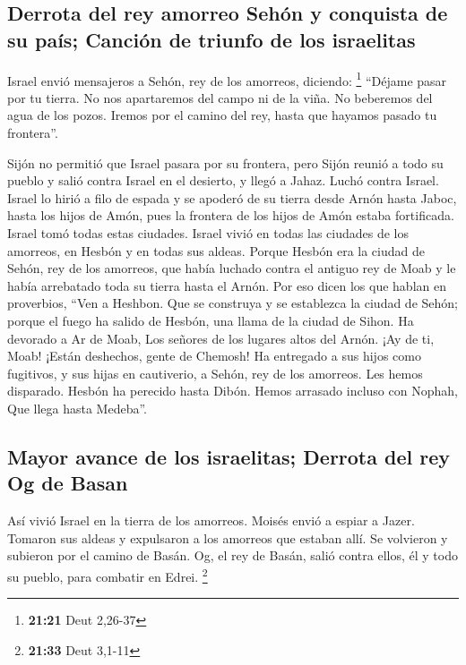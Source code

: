 \hypertarget{derrota-del-rey-amorreo-sehuxf3n-y-conquista-de-su-pauxeds-canciuxf3n-de-triunfo-de-los-israelitas}{%
\subsection{Derrota del rey amorreo Sehón y conquista de su país;
Canción de triunfo de los
israelitas}\label{derrota-del-rey-amorreo-sehuxf3n-y-conquista-de-su-pauxeds-canciuxf3n-de-triunfo-de-los-israelitas}}

 Israel envió mensajeros a Sehón, rey de los amorreos,
diciendo: \footnote{\textbf{21:21} Deut 2,26-37} 
``Déjame pasar por tu tierra. No nos apartaremos del campo ni de la
viña. No beberemos del agua de los pozos. Iremos por el camino del rey,
hasta que hayamos pasado tu frontera''.

 Sijón no permitió que Israel pasara por su frontera,
pero Sijón reunió a todo su pueblo y salió contra Israel en el desierto,
y llegó a Jahaz. Luchó contra Israel.  Israel lo hirió a
filo de espada y se apoderó de su tierra desde Arnón hasta Jaboc, hasta
los hijos de Amón, pues la frontera de los hijos de Amón estaba
fortificada.  Israel tomó todas estas ciudades. Israel
vivió en todas las ciudades de los amorreos, en Hesbón y en todas sus
aldeas.  Porque Hesbón era la ciudad de Sehón, rey de los
amorreos, que había luchado contra el antiguo rey de Moab y le había
arrebatado toda su tierra hasta el Arnón.  Por eso dicen
los que hablan en proverbios, ``Ven a Heshbon. Que se construya y se
establezca la ciudad de Sehón;  porque el fuego ha salido
de Hesbón, una llama de la ciudad de Sihon. Ha devorado a Ar de Moab,
Los señores de los lugares altos del Arnón.  ¡Ay de ti,
Moab! ¡Están deshechos, gente de Chemosh! Ha entregado a sus hijos como
fugitivos, y sus hijas en cautiverio, a Sehón, rey de los amorreos.
 Les hemos disparado. Hesbón ha perecido hasta Dibón.
Hemos arrasado incluso con Nophah, Que llega hasta Medeba''.

\hypertarget{mayor-avance-de-los-israelitas-derrota-del-rey-og-de-basan}{%
\subsection{Mayor avance de los israelitas; Derrota del rey Og de
Basan}\label{mayor-avance-de-los-israelitas-derrota-del-rey-og-de-basan}}

 Así vivió Israel en la tierra de los amorreos.
 Moisés envió a espiar a Jazer. Tomaron sus aldeas y
expulsaron a los amorreos que estaban allí.  Se volvieron
y subieron por el camino de Basán. Og, el rey de Basán, salió contra
ellos, él y todo su pueblo, para combatir en Edrei. \footnote{\textbf{21:33}
  Deut 3,1-11}

